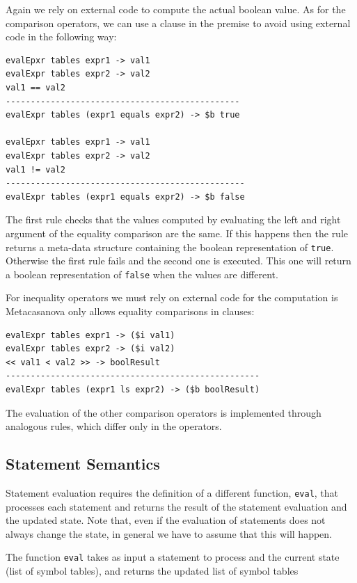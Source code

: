 \noindent
Again we rely on external code to compute the actual boolean value.
As for the comparison operators, we can use a clause in the premise to avoid using external code in the following way:

\begin{lstlisting}
evalEpxr tables expr1 -> val1
evalExpr tables expr2 -> val2
val1 == val2
-----------------------------------------------
evalExpr tables (expr1 equals expr2) -> $b true

evalEpxr tables expr1 -> val1
evalExpr tables expr2 -> val2
val1 != val2
------------------------------------------------
evalExpr tables (expr1 equals expr2) -> $b false
\end{lstlisting}

\noindent
The first rule checks that the values computed by evaluating the left and right argument of the equality comparison are the same. If this happens then the rule returns a meta-data structure containing the boolean representation of \texttt{true}. Otherwise the first rule fails and the second one is executed. This one will return a boolean representation of \texttt{false} when the values are different.

For inequality operators we must rely on external code for the computation is Metacasanova only allows equality comparisons in clauses:

\begin{lstlisting}
evalExpr tables expr1 -> ($i val1)
evalExpr tables expr2 -> ($i val2)
<< val1 < val2 >> -> boolResult
---------------------------------------------------
evalExpr tables (expr1 ls expr2) -> ($b boolResult)
\end{lstlisting}

\noindent
The evaluation of the other comparison operators is implemented through analogous rules, which differ only in the operators.

\subsection{Statement Semantics}
\label{subsec:ch_mcnv_languages_statement_semantics}

Statement evaluation requires the definition of a different function, \texttt{eval}, that processes each statement and returns the result of the statement evaluation and the updated state. Note that, even if the evaluation of statements does not always change the state, in general we have to assume that this will happen.

The function \texttt{eval} takes as input a statement to process and the current state (list of symbol tables), and returns the updated list of symbol tables

